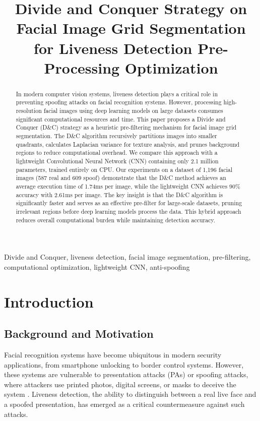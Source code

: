 \documentclass[conference]{IEEEtran}
\title{Divide and Conquer Strategy on Facial Image Grid Segmentation for Liveness Detection Pre-Processing Optimization}
\author{\IEEEauthorblockN{Kurt Mikhael Purba}
\IEEEauthorblockA{Program Studi Teknik Informatika\\
Sekolah Teknik Elektro dan Informatika\\
Institut Teknologi Bandung, Jalan Ganesha 10 Bandung\\
E-mail: kurtmikhael123@gmail.com , 13524065@std.stei.itb.ac.id}
}
\begin{document}
\maketitle

\begin{abstract}
In modern computer vision systems, liveness detection plays a critical role in preventing spoofing attacks on facial recognition systems. However, processing high-resolution facial images using deep learning models on large datasets consumes significant computational resources and time. This paper proposes a Divide and Conquer (D\&C) strategy as a heuristic pre-filtering mechanism for facial image grid segmentation. The D\&C algorithm recursively partitions images into smaller quadrants, calculates Laplacian variance for texture analysis, and prunes background regions to reduce computational overhead. We compare this approach with a lightweight Convolutional Neural Network (CNN) containing only 2.1 million parameters, trained entirely on CPU. Our experiments on a dataset of 1,196 facial images (587 real and 609 spoof) demonstrate that the D\&C method achieves an average execution time of 1.74ms per image, while the lightweight CNN achieves 90\% accuracy with 2.61ms per image. The key insight is that the D\&C algorithm is significantly faster and serves as an effective pre-filter for large-scale datasets, pruning irrelevant regions before deep learning models process the data. This hybrid approach reduces overall computational burden while maintaining detection accuracy.
\end{abstract}

\renewcommand{\IEEEkeywordsname}{Keywords}
\begin{IEEEkeywords}
Divide and Conquer, liveness detection, facial image segmentation, pre-filtering, computational optimization, lightweight CNN, anti-spoofing
\end{IEEEkeywords}


\section{Introduction}

\subsection{Background and Motivation}

Facial recognition systems have become ubiquitous in modern security applications, from smartphone unlocking to border control systems. However, these systems are vulnerable to presentation attacks (PAs) or spoofing attacks, where attackers use printed photos, digital screens, or masks to deceive the system \cite{galbally2014}. Liveness detection, the ability to distinguish between a real live face and a spoofed presentation, has emerged as a critical countermeasure against such attacks.
\end{document}
